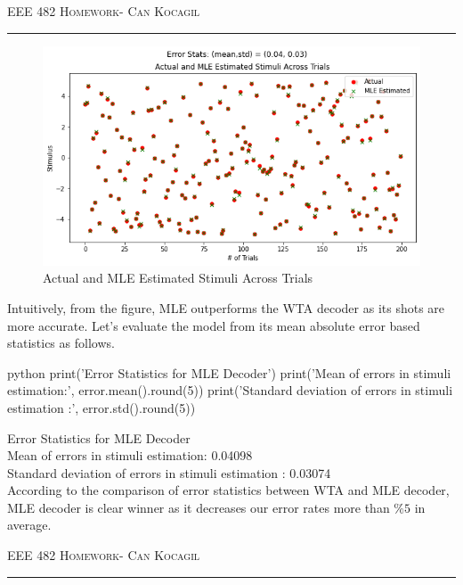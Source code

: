 \documentclass[12pt]{amsart}
\begin{document}
\newpage
{\scshape EEE 482} \hfill {\scshape \large  Homework-\relax} \hfill {\scshape Can Kocagil}
\smallskip
\hrule
\vspace{2mm}


\begin{figure}[h]
    \centering
        \includegraphics[width = 1\textwidth]{images/Q2/MLE.png}
        \caption{Actual and MLE Estimated Stimuli Across Trials}
\end{figure}


Intuitively, from the figure, MLE outperforms the WTA decoder as its shots are more accurate. Let's evaluate the model from its mean absolute error based statistics as follows.


\begin{mintedbox}{python}
print('Error Statistics for MLE Decoder')
print('Mean of errors in stimuli estimation:', error.mean().round(5))
print('Standard deviation of errors in stimuli estimation :', error.std().round(5))
\end{mintedbox}

Error Statistics for MLE Decoder \\
Mean of errors in stimuli estimation: 0.04098\\
Standard deviation of errors in stimuli estimation : 0.03074\\

According to the comparison of error statistics between WTA and MLE decoder, MLE decoder is clear winner as it decreases our error rates more than $\%5$ in average.




\newpage
{\scshape EEE 482} \hfill {\scshape \large  Homework-\relax} \hfill {\scshape Can Kocagil}
\smallskip
\hrule
\vspace{2mm}
\end{document}
